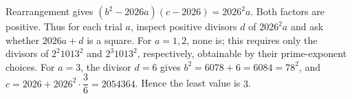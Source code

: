 Rearrangement gives $(b^2-2026a)(c-2026)=2026^2a$. Both factors are positive. Thus for each trial $a$, inspect positive divisors $d$ of $2026^2a$ and ask whether $2026a+d$ is a square. For $a=1,2$, none is; this requires only the divisors of $2^2 1013^2$ and $2^3 1013^2$, respectively, obtainable by their prime-exponent choices. For $a=3$, the divisor $d=6$ gives $b^2=6078+6=6084=78^2$, and $c = 2026 + 2026^2 \cdot \dfrac{3}{6} = 2054364$. Hence the least value is $\boxed3$.
